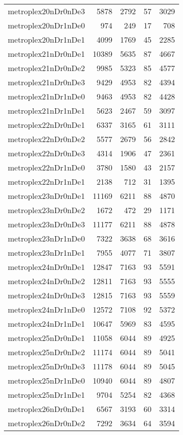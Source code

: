 \documentclass[../../../thesis.tex]{subfiles}
\begin{document}
\begin{longtable}{lrrrr}
metroplex20nDr0nDe3 & 5878 & 2792 & 57 & 3029 \\
metroplex20nDr1nDe0 & 974 & 249 & 17 & 708 \\
metroplex20nDr1nDe1 & 4099 & 1769 & 45 & 2285 \\
metroplex21nDr0nDe1 & 10389 & 5635 & 87 & 4667 \\
metroplex21nDr0nDe2 & 9985 & 5323 & 85 & 4577 \\
metroplex21nDr0nDe3 & 9429 & 4953 & 82 & 4394 \\
metroplex21nDr1nDe0 & 9463 & 4953 & 82 & 4428 \\
metroplex21nDr1nDe1 & 5623 & 2467 & 59 & 3097 \\
metroplex22nDr0nDe1 & 6337 & 3165 & 61 & 3111 \\
metroplex22nDr0nDe2 & 5577 & 2679 & 56 & 2842 \\
metroplex22nDr0nDe3 & 4314 & 1906 & 47 & 2361 \\
metroplex22nDr1nDe0 & 3780 & 1580 & 43 & 2157 \\
metroplex22nDr1nDe1 & 2138 & 712 & 31 & 1395 \\
metroplex23nDr0nDe1 & 11169 & 6211 & 88 & 4870 \\
metroplex23nDr0nDe2 & 1672 & 472 & 29 & 1171 \\
metroplex23nDr0nDe3 & 11177 & 6211 & 88 & 4878 \\
metroplex23nDr1nDe0 & 7322 & 3638 & 68 & 3616 \\
metroplex23nDr1nDe1 & 7955 & 4077 & 71 & 3807 \\
metroplex24nDr0nDe1 & 12847 & 7163 & 93 & 5591 \\
metroplex24nDr0nDe2 & 12811 & 7163 & 93 & 5555 \\
metroplex24nDr0nDe3 & 12815 & 7163 & 93 & 5559 \\
metroplex24nDr1nDe0 & 12572 & 7108 & 92 & 5372 \\
metroplex24nDr1nDe1 & 10647 & 5969 & 83 & 4595 \\
metroplex25nDr0nDe1 & 11058 & 6044 & 89 & 4925 \\
metroplex25nDr0nDe2 & 11174 & 6044 & 89 & 5041 \\
metroplex25nDr0nDe3 & 11178 & 6044 & 89 & 5045 \\
metroplex25nDr1nDe0 & 10940 & 6044 & 89 & 4807 \\
metroplex25nDr1nDe1 & 9704 & 5254 & 82 & 4368 \\
metroplex26nDr0nDe1 & 6567 & 3193 & 60 & 3314 \\
metroplex26nDr0nDe2 & 7292 & 3634 & 64 & 3594 \\

\end{longtable}
\end{document}
